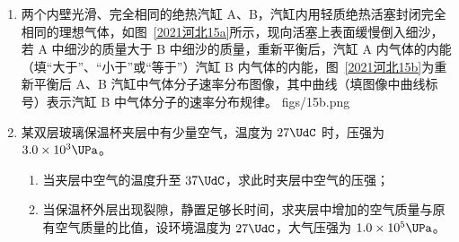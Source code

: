 \documentclass[\gkver]{gaokaozhenti}
\begin{document}
\begin{enumerate}
{（3）设粒子第一次经过电场加速，在负极板上方磁场区域偏转的轨迹半径为 $r_{0}$，若粒子在电场加速电压小于 $U_{\min}$，粒子穿过磁场在正极板下方磁场运动时，会被 OM 板吸收。则第一次出现能吸收到两种能量的位置（即 H 点），为粒子通过极板电压 $U_{\min}=\frac{7mv_{0}^{2}}{18q}$ 时，粒子第二次从上方打到负极板的位置（轨迹如图中蓝色线条所示）。由（2）的计算可知
$r_{1}=\frac{4mv_{0}}{3qB}$
则
$CH=4r_1-2r'=\frac{10mv_{0}}{3qB}$
极板电压大于 $U_{\min}=\frac{7mv_{0}^{2}}{18q}$ 时，粒子均不会被 OM 吸收，可以经过正极板下方磁场偏转，回到负极板上方磁场中，偏转后打在负极板上。则 H 点右方的点的粒子靶都可以接受到 $n$（$n\geqslant2$）种能量的粒子。即 $CS\to\infty$。
}

\item
两个内壁光滑、完全相同的绝热汽缸 A、B，汽缸内用轻质绝热活塞封闭完全相同的理想气体，如图~\ref{2021河北15a}所示，现向活塞上表面缓慢倒入细沙，若 A 中细沙的质量大于 B 中细沙的质量，重新平衡后，汽缸 A 内气体的内能（填“大于”、“小于”或“等于”）汽缸 B 内气体的内能，图~\ref{2021河北15b}为重新平衡后 A、B 汽缸中气体分子速率分布图像，其中曲线（填图像中曲线标号）表示汽缸 B 中气体分子的速率分布规律。
{figs/15b.png}


\item
某双层玻璃保温杯夹层中有少量空气，温度为 $27\UdC$ 时，压强为 $3.0\times10^{3}\UPa$。
\begin{enumerate}
	\item
	当夹层中空气的温度升至 $37\UdC$，求此时夹层中空气的压强；
	\item
	当保温杯外层出现裂隙，静置足够长时间，求夹层中增加的空气质量与原有空气质量的比值，设环境温度为 $27\UdC$，大气压强为 $1.0\times10^{5}\UPa$。
\end{enumerate}


\end{enumerate}
\end{document}
